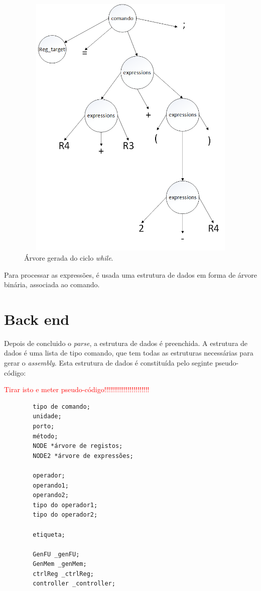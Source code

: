 \begin{figure}[!htb]
  \centering
  \includegraphics[height=130mm, width=130mm]{Figures/parse_da_expressao.png}
  \caption[Árvore gerada do ciclo {\it while}.]{Árvore gerada do ciclo {\it while}.}  
  \label{fig:arvore exp}
\end{figure}

\pagebreak


Para processar as expressões, é usada uma estrutura de dados em forma de árvore binária, associada ao comando.

\section{Back end}
\label{chapter:back end}

Depois de concluido o {\it parse}, a estrutura de dados é preenchida. A estrutura de dados é uma lista de tipo comando, que tem 
todas as estruturas necessárias para gerar o {\it assembly}. Esta estrutura de dados é constituída pelo seginte pseudo-código:

\textcolor{red}{Tirar isto e meter pseudo-código!!!!!!!!!!!!!!!!!!!!!!!}

\begin{lstlisting}
		tipo de comando;
		unidade;
		porto;
		método;
		NODE *árvore de registos;
		NODE2 *árvore de expressões;

		operador;
		operando1;
		operando2;
		tipo do operador1;
		tipo do operador2;
		
		etiqueta;
		
		GenFU _genFU;
		GenMem _genMem;
		ctrlReg _ctrlReg;
		controller _controller;
\end{lstlisting}

